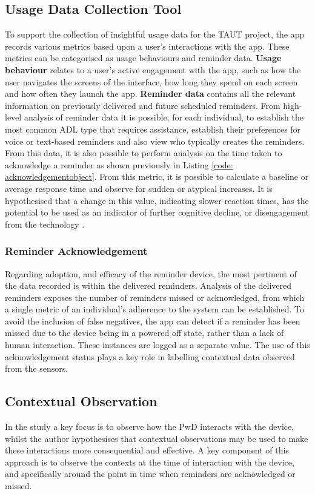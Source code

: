 \subsection{Usage Data Collection Tool}
To support the collection of insightful usage data for the TAUT project, the app records various metrics based upon a user’s interactions with the app. These metrics can be categorised as usage behaviours and reminder data.
\newline \textbf{Usage behaviour} relates to a user’s active engagement with the app, such as how the user navigates the screens of the interface, how long they spend on each screen and how often they launch the app.
\newline \textbf{Reminder data} contains all the relevant information on previously delivered and future scheduled reminders. From high-level analysis of reminder data it is possible, for each individual, to establish the most common ADL type that requires assistance, establish their preferences for voice or text-based reminders and also view who typically creates the reminders.
From this data, it is also possible to perform analysis on the time taken to acknowledge a reminder as shown previously in Listing \ref{code: acknowledgementobject}. From this metric, it is possible to calculate a baseline or average response time and observe for sudden or atypical increases. It is hypothesised that a change in this value, indicating slower reaction times, has the potential to be used as an indicator of further cognitive decline, or disengagement from the technology \cite{Phillips2013}.

\subsubsection{Reminder Acknowledgement}
Regarding adoption, and efficacy of the reminder device, the most pertinent of the data recorded is within the delivered reminders. Analysis of the delivered reminders exposes the number of reminders missed or acknowledged, from which a single metric of an individual’s adherence to the system can be established. To avoid the inclusion of false negatives, the app can detect if a reminder has been missed due to the device being in a powered off state, rather than a lack of human interaction. These instances are logged as a separate value.
The use of this acknowledgement status plays a key role in labelling contextual data observed from the sensors.

\subsection{Contextual Observation}
In the study a key focus is to observe how the PwD interacts with the device, whilst the author hypothesises that contextual observations may be used to make these interactions more consequential and effective. A key component of this approach is to observe the contexts at the time of interaction with the device, and specifically around the point in time when reminders are acknowledged or missed.
